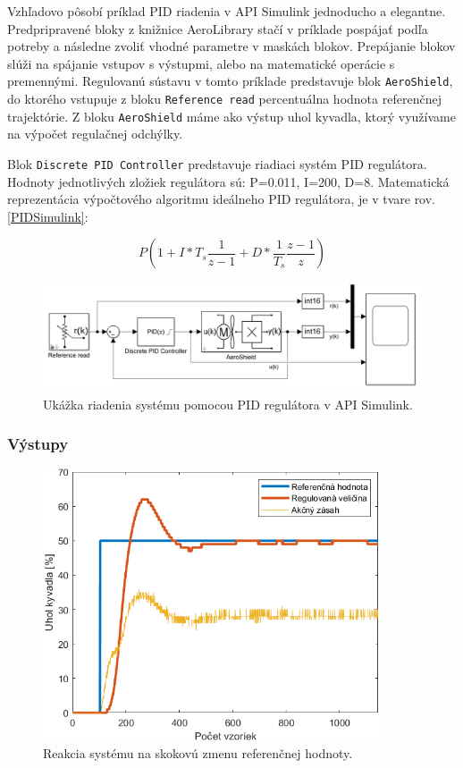 Vzhľadovo pôsobí príklad PID riadenia v API Simulink jednoducho a elegantne. Predpripravené bloky z knižnice AeroLibrary stačí v príklade pospájať podľa potreby a následne zvoliť vhodné parametre v maskách blokov. Prepájanie blokov slúži na spájanie vstupov s výstupmi, alebo na matematické operácie s premennými. Regulovanú sústavu v tomto príklade predstavuje blok \verb|AeroShield|, do ktorého vstupuje z bloku \verb|Reference read| percentuálna hodnota referenčnej trajektórie. Z bloku \verb|AeroShield| máme ako výstup uhol kyvadla, ktorý využívame na výpočet regulačnej odchýlky.  

Blok \verb|Discrete PID Controller| predstavuje riadiaci systém PID regulátora. Hodnoty jednotlivých zložiek regulátora sú: P=0.011, I=200, D=8. Matematická reprezentácia výpočtového algoritmu ideálneho PID regulátora, je v tvare rov.\ref{PIDSimulink}:

\begin{equation}\label{PIDSimulink}
	P\left(1+I*T_s\dfrac{1}{z-1}+D*\dfrac{1}{T_s}\dfrac{z-1}{z}\right)
\end{equation}


\begin{figure}[!tbh]
	\centering
	\includegraphics[width=125mm]{obr/SimulinkPID.png}
	\caption{Ukážka riadenia systému pomocou PID regulátora v API Simulink.}\label{OBRAZOK 2.6.10}
\end{figure}

\subsubsection{Výstupy}

\begin{figure}[!tbh]
	\centering
	\includegraphics[width=100mm]{obr/SimSkok.png}
	\caption{Reakcia systému na skokovú zmenu referenčnej hodnoty.}\label{OBRAZOK 2.6.11}
\end{figure}

